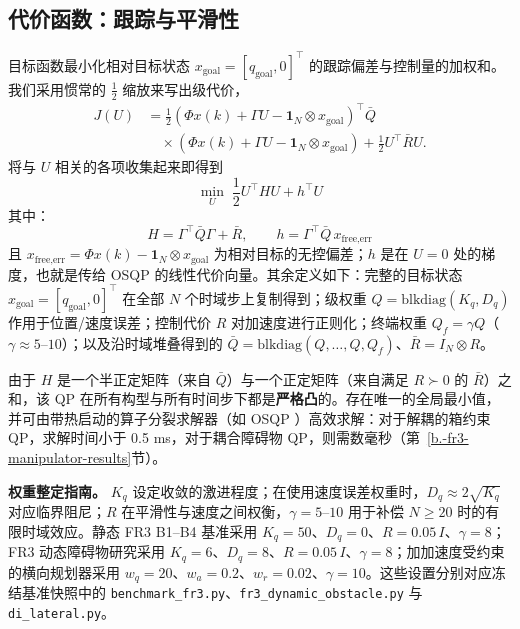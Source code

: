\subsection{代价函数：跟踪与平滑性}\label{b.-cost-function-tracking-and-smoothness}

目标函数最小化相对目标状态 \(x_{\text{goal}} = [q_{\text{goal}}, 0]^\top\) 的跟踪偏差与控制量的加权和。我们采用惯常的 \(\tfrac{1}{2}\) 缩放来写出级代价，
\begin{align}
\label{eq:tracking-cost}
J(U)
&=\frac{1}{2}
\left(\Phi x(k)+\Gamma U-\mathbf{1}_N\otimes x_{\text{goal}}\right)^\top
\bar Q \nonumber\\
&\quad \times
\left(\Phi x(k)+\Gamma U-\mathbf{1}_N\otimes x_{\text{goal}}\right)
+\frac{1}{2}U^\top\bar R U .
\end{align}
将与 \(U\) 相关的各项收集起来即得到
\begin{equation}
\label{eq:qp-objective}
\min_{U} \; \frac{1}{2} U^\top H U + h^\top U
\end{equation}
其中：
\begin{equation}
\label{eq:qp-hessian-gradient}
H = \Gamma^\top \bar{Q} \Gamma + \bar{R}, \qquad
h = \Gamma^\top \bar{Q} \, x_{\text{free,err}}
\end{equation}
且 \(x_{\text{free,err}} = \Phi x(k) - \mathbf{1}_N \otimes x_{\text{goal}}\) 为相对目标的无控偏差；\(h\) 是在 \(U=0\) 处的梯度，也就是传给 OSQP 的线性代价向量。其余定义如下：完整的目标状态 \(x_{\text{goal}}=[q_{\text{goal}},0]^\top\) 在全部 \(N\) 个时域步上复制得到；级权重 \(Q = \text{blkdiag}(K_q, D_q)\) 作用于位置/速度误差；控制代价 \(R\) 对加速度进行正则化；终端权重 \(Q_f = \gamma Q\)（\(\gamma \approx 5\)--\(10\)）；以及沿时域堆叠得到的 \(\bar Q = \mathrm{blkdiag}(Q,\dots,Q,Q_f)\)、\(\bar R = I_N \otimes R\)。

由于 \(H\) 是一个半正定矩阵（来自 \(\bar{Q}\)）与一个正定矩阵（来自满足 \(R \succ 0\) 的 \(\bar{R}\)）之和，该 QP 在所有构型与所有时间步下都是\textbf{严格凸}的。存在唯一的全局最小值，并可由带热启动的算子分裂求解器（如 OSQP \cite{osqp}）高效求解：对于解耦的箱约束 QP，求解时间小于 0.5 ms，对于耦合障碍物 QP，则需数毫秒（第~\ref{b.-fr3-manipulator-results}节）。

\textbf{权重整定指南。} \(K_q\) 设定收敛的激进程度；在使用速度误差权重时，\(D_q\!\approx\!2\sqrt{K_q}\) 对应临界阻尼；\(R\) 在平滑性与速度之间权衡，\(\gamma=5\)--\(10\) 用于补偿 \(N\geq20\) 时的有限时域效应。静态 FR3 B1--B4 基准采用 \(K_q=50\)、\(D_q=0\)、\(R=0.05\,I\)、\(\gamma=8\)；FR3 动态障碍物研究采用 \(K_q=6\)、\(D_q=8\)、\(R=0.05\,I\)、\(\gamma=8\)；加加速度受约束的横向规划器采用 \(w_q=20\)、\(w_a=0.2\)、\(w_r=0.02\)、\(\gamma=10\)。这些设置分别对应冻结基准快照中的 \texttt{benchmark\_fr3.py}、\texttt{fr3\_dynamic\_obstacle.py} 与 \texttt{di\_lateral.py}。

